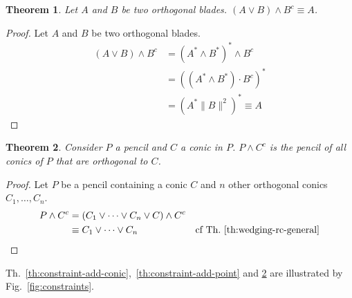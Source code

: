\documentclass{birkjour}
\newtheorem{theorem}{Theorem}
\begin{document}
\begin{theorem} \label{th:wedging-rc-general}
Let \(A\) and \(B\) be two orthogonal blades. \((A \vee B) \wedge B^c \equiv A\).
\end{theorem}
\begin{proof}
    Let \(A\) and \(B\) be two orthogonal blades.
    \begin{align}
        (A \vee B) \wedge B^c &= (A^* \wedge B^*)^* \wedge B^c \\
        &= ((A^* \wedge B^*) \cdot B^c)^* \\
        &= (A^* \|B\|^2)^* 
        \equiv A 
    \end{align}
\end{proof}


\begin{theorem} \label{th:constraint-remove-conic}
    Consider \(P\) a pencil and \(C\) a conic in \(P\).
    \(P\wedge C^c\) is the pencil of all conics of \(P\) that are orthogonal to \(C\).
\end{theorem}
\begin{proof}
    Let \(P\) be a pencil containing a conic \(C\) and \(n\) other orthogonal conics \(C_1,\dots,C_n\).
    \begin{align}
    P\wedge C^c &= (C_1 \vee \dots \vee C_n \vee C) \wedge C^c \\
                &\equiv C_1 \vee \dots \vee C_n & \mbox{cf Th.~\ref{th:wedging-rc-general}}
    \end{align}
\end{proof}
Th.~\ref{th:constraint-add-conic},~\ref{th:constraint-add-point} and \ref{th:constraint-remove-conic} are illustrated by Fig.~\ref{fig:constraints}.
\end{document}
